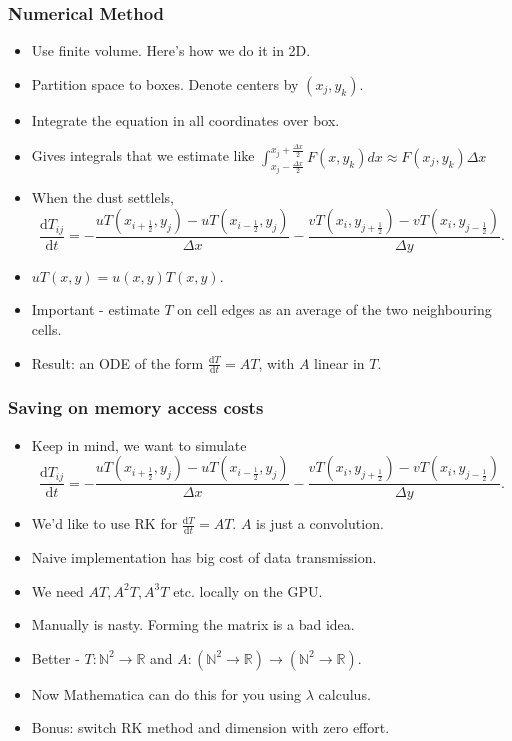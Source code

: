 \documentclass[]{beamer}
\newcommand{\der}{\text{d}}
\begin{document}
\begin{frame}
  \frametitle{Numerical Method}   %

  \begin{itemize}
  \item<1-> Use finite volume. Here's how we do it in 2D.
  \item<2-> Partition space to boxes. Denote centers by $(x_j, y_k)$. 
  \item<3-> Integrate the equation in all coordinates over box.
  \item<4-> Gives integrals that we estimate like $\int_{x_j - \frac{\Delta x}{2}}^{x_j + \frac{\Delta x}{2}} F(x,y_k) dx \approx F(x_j ,y_k)\Delta x$
  \item<5-> When the dust settlels, 
  $$
  \frac{\der T_{ij}}{\der t} = -\frac{uT(x_{i+\frac{1}{2}} , y_j) - uT(x_{i-\frac{1}{2}} , y_j)}{\Delta x} -\frac{vT(x_i , y_{j+\frac{1}{2}}) - vT(x_i , y_{j-\frac{1}{2}})}{\Delta y}.
  $$  
  \item<6-> $uT(x,y) = u(x,y) T(x,y)$.
  \item<7-> Important - estimate $T$ on cell edges as an average of the two neighbouring cells.
  \item<8-> Result: an ODE of the form $\frac{\der T}{\der t} = AT$, with $A$ linear in $T$.
  \end{itemize}
\end{frame}

\begin{frame}
  \frametitle{Saving on memory access costs}   %

  \begin{itemize}
\item<1-> Keep in mind, we want to simulate
  $$
  \frac{\der T_{ij}}{\der t} = -\frac{uT(x_{i+\frac{1}{2}} , y_j) - uT(x_{i-\frac{1}{2}} , y_j)}{\Delta x} -\frac{vT(x_i , y_{j+\frac{1}{2}}) - vT(x_i , y_{j-\frac{1}{2}})}{\Delta y}.
  $$  
  \item<2-> We'd like to use RK for $\frac{\der T}{\der t} = AT$. $A$ is just a convolution.
  \item<3-> Naive implementation has big cost of data transmission.
  \item<4-> We need $AT, A^2T, A^3T$ etc. locally on the GPU.
  \item<4-> Manually is nasty. Forming the matrix is a bad idea.
  \item<5-> Better - $T: \mathbb{N}^2 \to \mathbb{R}$ and $A:(\mathbb{N}^2 \to \mathbb{R}) \to (\mathbb{N}^2 \to \mathbb{R})$.  
  \item<6-> Now Mathematica can do this for you using $\lambda$ calculus.
  \item<7-> Bonus: switch RK method and dimension with zero effort.
  \end{itemize}
\end{frame}
\end{document}
